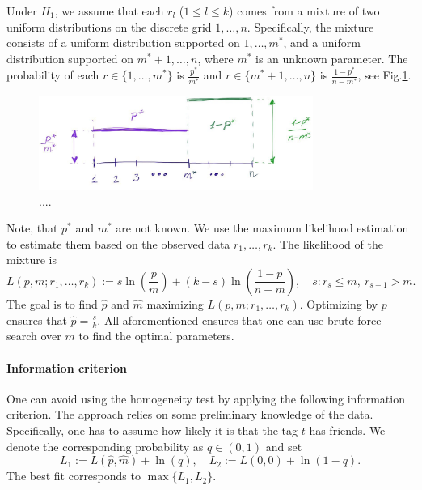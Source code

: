 \documentclass{llncs}
\begin{document}
Under $H_1$, we assume that each $r_l$ ($1\le l \le k$) comes from a mixture of two uniform distributions on the discrete grid $1, \dots, n$.
Specifically, the mixture consists of a uniform distribution supported on $1, \dots, m^*$, and a uniform distribution supported on $m^* + 1, \dots, n$, where $m^*$ is an unknown parameter. The probability of each $r \in \{1, \dots, m^*\}$ is $\frac{p^{*}}{m^*}$ and $r \in \{ m^*+1, \dots, n\}$ is $\frac{1 - p^{*}}{n - m^*}$,
see Fig.\ref{fig:model}.
\begin{figure}
 \centering
\includegraphics[width=0.8\textwidth]{model.jpeg}
 \caption{....}
 \label{fig:model}
\end{figure}

Note, that $p^*$ and $m^*$ are not known.
We use the maximum likelihood estimation to estimate them based on the observed data $r_1, \dots, r_k$. The likelihood of the mixture is
\[
L(p, m; r_1, \dots, r_k) := s\ln\left(\frac{p}{m}\right) + (k-s)\ln\left(\frac{1-p}{n - m}\right),
\quad
s: r_{s} \le m, ~r_{s+1} > m.
\]
The goal is to find $\hat{p}$ and $\hat{m}$ maximizing $L(p, m; r_1, \dots, r_k)$. Optimizing by $p$ ensures that $\hat{p} = \frac{s}{k}$. All aforementioned ensures that one can use brute-force search over $m$ to find the optimal parameters.

\paragraph{Information criterion}
One can avoid using the homogeneity test by applying the following information criterion.
The approach relies on some preliminary knowledge of the data. Specifically, one has to assume how likely it is that the tag $t$ has friends. We denote the corresponding probability as $q \in (0, 1)$ and set
\[
L_1 := L(\hat{p}, \hat{m}) + \ln(q),
\quad
L_2 := L(0, 0) + \ln(1-q).
\]
The best fit corresponds to $\max\{L_1, L_2\}$.



\end{document}
